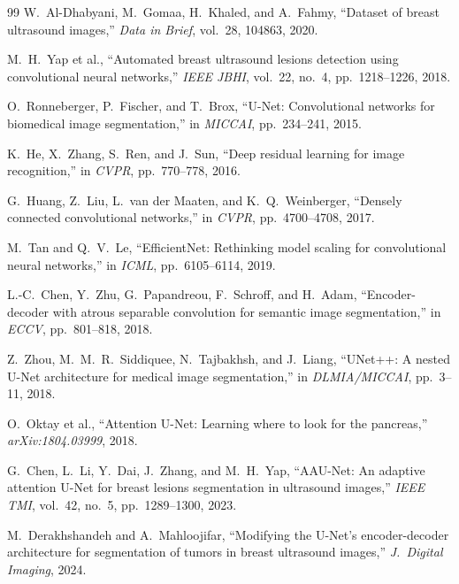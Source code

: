 \documentclass[10pt,twocolumn]{article}
\begin{document}
\begingroup
\footnotesize
\begin{thebibliography}{99}
\itemsep0pt
W.~Al-Dhabyani, M.~Gomaa, H.~Khaled, and A.~Fahmy, ``Dataset of breast ultrasound
images,'' \emph{Data in Brief}, vol.~28, 104863, 2020.

M.~H.~Yap et al., ``Automated breast ultrasound lesions detection using
convolutional neural networks,'' \emph{IEEE JBHI}, vol.~22, no.~4, pp.~1218--1226,
2018.

O.~Ronneberger, P.~Fischer, and T.~Brox, ``U-Net: Convolutional networks for
biomedical image segmentation,'' in \emph{MICCAI}, pp.~234--241, 2015.

K.~He, X.~Zhang, S.~Ren, and J.~Sun, ``Deep residual learning for image
recognition,'' in \emph{CVPR}, pp.~770--778, 2016.

G.~Huang, Z.~Liu, L.~van der Maaten, and K.~Q.~Weinberger, ``Densely connected
convolutional networks,'' in \emph{CVPR}, pp.~4700--4708, 2017.

M.~Tan and Q.~V.~Le, ``EfficientNet: Rethinking model scaling for convolutional
neural networks,'' in \emph{ICML}, pp.~6105--6114, 2019.

L.-C.~Chen, Y.~Zhu, G.~Papandreou, F.~Schroff, and H.~Adam, ``Encoder-decoder with
atrous separable convolution for semantic image segmentation,'' in \emph{ECCV},
pp.~801--818, 2018.

Z.~Zhou, M.~M.~R.~Siddiquee, N.~Tajbakhsh, and J.~Liang, ``UNet++: A nested U-Net
architecture for medical image segmentation,'' in \emph{DLMIA/MICCAI}, pp.~3--11,
2018.

O.~Oktay et al., ``Attention U-Net: Learning where to look for the pancreas,''
\emph{arXiv:1804.03999}, 2018.

G.~Chen, L.~Li, Y.~Dai, J.~Zhang, and M.~H.~Yap, ``AAU-Net: An adaptive attention
U-Net for breast lesions segmentation in ultrasound images,'' \emph{IEEE TMI},
vol.~42, no.~5, pp.~1289--1300, 2023.

M.~Derakhshandeh and A.~Mahloojifar, ``Modifying the U-Net's encoder-decoder
architecture for segmentation of tumors in breast ultrasound images,''
\emph{J.\ Digital Imaging}, 2024.


\end{thebibliography}
\end{document}
